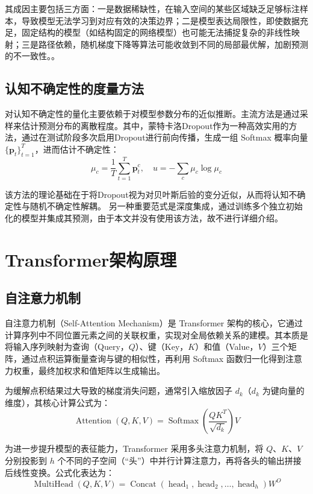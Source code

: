 \documentclass[twoside,openright]{xduugthesis}
\begin{document}
其成因主要包括三方面：一是数据稀缺性，在输入空间的某些区域缺乏足够标注样本，导致模型无法学习到对应有效的决策边界；二是模型表达局限性，即使数据充足，固定结构的模型（如结构固定的网络模型）也可能无法捕捉复杂的非线性映射；三是路径依赖，随机梯度下降等算法可能收敛到不同的局部最优解，加剧预测的不一致性。。

\subsection{认知不确定性的度量方法}
对认知不确定性的量化主要依赖于对模型参数分布的近似推断。主流方法是通过采样来估计预测分布的离散程度。其中，蒙特卡洛Dropout作为一种高效实用的方法，通过在测试阶段多次启用Dropout进行前向传播，生成一组 Softmax 概率向量 $\{\mathbf{p}_t\}_{t=1}^T$，进而估计不确定性：
$$
\mu_c = \frac{1}{T} \sum_{t=1}^T \mathbf{p}_t^c, \quad u = -\sum_{c} \mu_c \log \mu_c
$$

该方法的理论基础在于将Dropout视为对贝叶斯后验的变分近似，从而将认知不确定性与随机不确定性解耦。
另一种重要范式是深度集成，通过训练多个独立初始化的模型并集成其预测，由于本文并没有使用该方法，故不进行详细介绍。

\section{Transformer架构原理}

\subsection{自注意力机制}

自注意力机制（Self-Attention Mechanism）是 Transformer 架构的核心，它通过计算序列中不同位置元素之间的关联权重，实现对全局依赖关系的建模。其本质是将输入序列映射为查询（Query，$Q$）、键（Key，$K$）和值（Value，$V$）三个矩阵，通过点积运算衡量查询与键的相似性，再利用 Softmax 函数归一化得到注意力权重，最终加权求和值矩阵以生成输出。

为缓解点积结果过大导致的梯度消失问题，通常引入缩放因子 $d_k$（$d_k$ 为键向量的维度），其核心计算公式为：
\begin{equation}
\operatorname{Attention}(Q, K, V) = \operatorname{Softmax}\left(\frac{QK^{T}}{\sqrt{d_{k}}}\right) V
\end{equation}

为进一步提升模型的表征能力，Transformer 采用多头注意力机制，将 $Q$、$K$、$V$ 分别投影到 $h$ 个不同的子空间（“头”）中并行计算注意力，再将各头的输出拼接后线性变换。公式化表达为：
\begin{equation}
\operatorname{MultiHead}(Q, K, V) = \operatorname{Concat}(\operatorname{head}_{1}, \operatorname{head}_{2}, \dots, \operatorname{head}_{h}) W^{O}
\end{equation}
\end{document}
